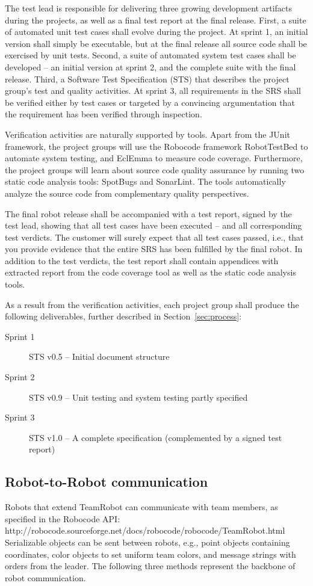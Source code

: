 \documentclass{scrreprt}
\begin{document}
The test lead is responsible for delivering three growing development artifacts during the projects, as well as a final test report at the final release. First, a suite of automated unit test cases shall evolve during the project. At sprint 1, an initial version shall simply be executable, but at the final release all source code shall be exercised by unit tests. Second, a suite of automated system test cases shall be developed -- an initial version at sprint 2, and the complete suite with the final release. Third, a Software Test Specification (STS) that describes the project group's test and quality activities. At sprint 3, all requirements in the SRS shall be verified either by test cases or targeted by a convincing argumentation that the requirement has been verified through inspection.

Verification activities are naturally supported by tools. Apart from the JUnit framework, the project groups will use the Robocode framework RobotTestBed to automate system testing, and EclEmma to measure code coverage. Furthermore, the project groups will learn about source code quality assurance by running two static code analysis tools: SpotBugs and SonarLint. The tools automatically analyze the source code from complementary quality perspectives.

The final robot release shall be accompanied with a test report, signed by the test lead, showing that all test cases have been executed -- and all corresponding test verdicts. The customer will surely expect that all test cases passed, i.e., that you provide evidence that the entire SRS has been fulfilled by the final robot. In addition to the test verdicts, the test report shall contain appendices with extracted report from the code coverage tool as well as the static code analysis tools.

As a result from the verification activities, each project group shall produce the following deliverables, further described in Section~\ref{sec:process}:
\begin{description}
\item[Sprint 1] STS v0.5 -- Initial document structure
\item[Sprint 2] STS v0.9 -- Unit testing and system testing partly specified
\item[Sprint 3] STS v1.0 -- A complete specification (complemented by a signed test report)
\end{description}

\subsection{Robot-to-Robot communication}
Robots that extend TeamRobot can communicate with team members, as specified in the Robocode API: http://robocode.sourceforge.net/docs/robocode/robocode/TeamRobot.html Serializable objects can be sent between robots, e.g., point objects containing coordinates, color objects to set uniform team colors, and message strings with orders from the leader. The following three methods represent the backbone of robot communication.\\
\end{document}
